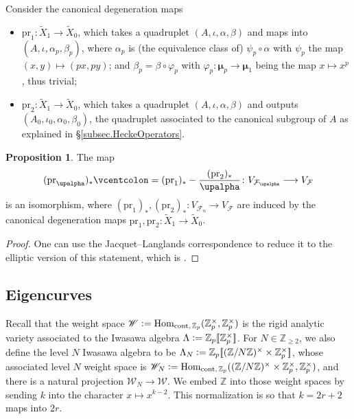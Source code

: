\documentclass[a4paper]{amsart}
\numberwithin{equation}{section}
\theoremstyle{definition}
\newtheorem{proposition}[theorem]{Proposition}
\newcommand{\Z}{\mathbb{Z}}
\newcommand{\defeq}{\vcentcolon=}
\DeclareMathOperator{\Hom}{Hom}
\begin{document}
Consider the canonical degeneration maps
\begin{itemize}
\item $\mathrm{pr}_1\colon \widetilde{X}_1\to \widetilde{X}_0$, which takes a quadruplet $(A,\iota,\alpha,\beta)$ and maps into $(A,\iota,\alpha_p,\beta_p)$, where $\alpha_p$ is (the equivalence class of) $\psi_p\circ\alpha$ with $\psi_p$ the map $(x,y)\mapsto (px,py)$; and $\beta_p=\beta\circ\varphi_p$ with $\varphi_p\colon\boldsymbol{\mu}_{p}\to\boldsymbol{\mu}_{1}$ being the map $x\mapsto x^p$, thus trivial;

\item $\mathrm{pr}_2\colon \widetilde{X}_1\to \widetilde{X}_0$, which takes a quadruplet $(A,\iota,\alpha,\beta)$ and outputs $(A_0,\iota_0,\alpha_0,\beta_0)$, the quadruplet associated to the canonical subgroup of $A$ as explained in \S\ref{subsec.HeckeOperators}.
\end{itemize}

\begin{proposition}\label{prop.ProjStabIsom}
The map
\begin{equation}\label{eq.ProjSlab}
(\mathrm{pr}_\upalpha)_*\defeq(\mathrm{pr}_1)_*-\frac{(\mathrm{pr}_2)_*}{\upalpha}\colon V_{\mathcal{F}_\upalpha}\longrightarrow V_{\mathcal{F}}
\end{equation}
is an isomorphism, where $(\mathrm{pr}_1)_*,(\mathrm{pr}_2)_*\colon V_{\mathcal{F}_\upalpha}\rightarrow V_{\mathcal{F}}$ are induced by the canonical degeneration maps $\mathrm{pr}_1,\mathrm{pr}_2\colon \widetilde{X}_1\to \widetilde{X}_0$.
\end{proposition}
\begin{proof}
One can use the Jacquet--Langlands correspondence to reduce it to the elliptic version of this statement, which is \cite[Proposition 7.3.1]{KingsLoefflerZerbes.ERL}.
\end{proof}

\subsection{Eigencurves}
Recall that the weight space $\mathscr{W}\defeq\Hom_{\mathrm{cont},\,\Z_p}(\Z_p^\times,\Z_p^\times)$ is the rigid analytic variety associated to the Iwasawa algebra $\Lambda\defeq\Z_p[\![\Z_p^\times]\!]$. For $N\in\Z_{\ge 2}$, we also define the level $N$ Iwasawa algebra to be $\Lambda_N\defeq\Z_p[\![(\Z/N\Z)^\times\times\Z_p^\times]\!]$, whose associated level $N$ weight space is $\mathscr{W}_N\defeq\Hom_{\mathrm{cont},\,\Z_p}((\Z/N\Z)^\times\times\Z_p^\times,\Z_p^\times)$, and there is a natural projection $\mathscr{W}_N\to\mathscr{W}$. We embed $\Z$ into those weight spaces by sending $k$ into the character $x\mapsto x^{k-2}$. This normalization is so that $k=2r+2$ maps into $2r$.
\end{document}
